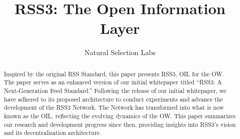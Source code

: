 \documentclass[conference]{IEEEtran}
\begin{document}
\title{RSS3: The Open Information Layer}

\author{Natural Selection Labs}
\maketitle

\thispagestyle{plain}
\pagestyle{plain}

\begin{abstract}

    Inspired by the original RSS Standard, this paper presents RSS3, \acrlong{OIL} for the \acrlong{OW}. The paper serves as an enhanced version of our initial whitepaper titled ``RSS3: A Next-Generation Feed Standard.'' Following the release of our initial whitepaper, we have adhered to its proposed architecture to conduct experiments and advance the development of the RSS3 Network. The Network has transformed into what is now known as the \acrlong{OIL}, reflecting the evolving dynamics of the \acrlong{OW}. This paper summarizes our research and development progress since then, providing insights into RSS3's vision and its decentralization architecture.

\end{abstract}












\printglossary[type=main,title=Glossary, toctitle=Glossary]





\end{document}
